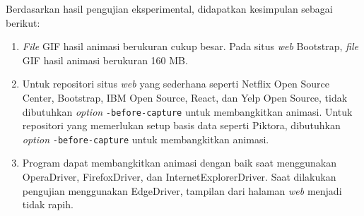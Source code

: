 Berdasarkan hasil pengujian eksperimental, didapatkan kesimpulan sebagai berikut:
\begin{enumerate}
\item \textit{File} GIF hasil animasi berukuran cukup besar. Pada situs \textit{web} Bootstrap, \textit{file} GIF hasil animasi berukuran 160 MB.
\item Untuk repositori situs \textit{web} yang sederhana seperti Netflix Open Source Center, Bootstrap, IBM Open Source, React, dan Yelp Open Source, tidak dibutuhkan \textit{option} \texttt{-before-capture} untuk membangkitkan animasi. Untuk repositori yang memerlukan setup basis data seperti Piktora, dibutuhkan \textit{option} \texttt{-before-capture} untuk membangkitkan animasi. 
\item Program dapat membangkitkan animasi dengan baik saat menggunakan OperaDriver, FirefoxDriver, dan InternetExplorerDriver. Saat dilakukan pengujian menggunakan EdgeDriver, tampilan dari halaman \textit{web} menjadi tidak rapih.
\end{enumerate}

